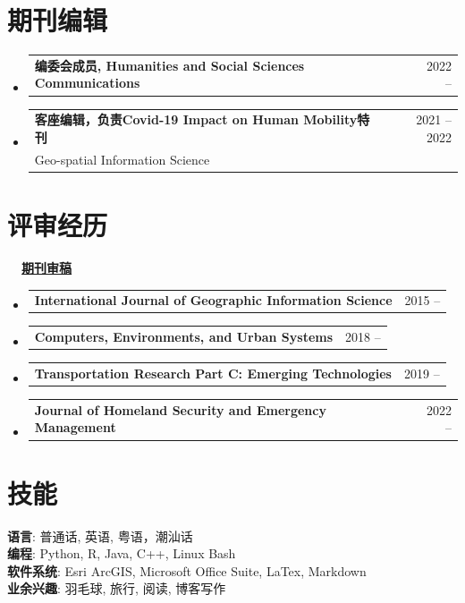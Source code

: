\documentclass[A4,11pt]{article}
\makeatletter
\newcommand{\CVSubheading}[4]{
  \vspace{-2pt}\item
    \begin{tabular*}{0.97\textwidth}[t]{l@{\extracolsep{\fill}}r}
      \textbf{#1} & #2 \\
      \small#3 & \small #4 \\
    \end{tabular*}\vspace{-7pt}
}
\newcommand{\CVSubheadingSimple}[2]{
  \vspace{-2pt}\item
    \begin{tabular*}{0.97\textwidth}[t]{l@{\extracolsep{\fill}}r}
      \textbf{#1} & #2 \\
    \end{tabular*}\vspace{-7pt}
}
\newcommand{\CVSubHeadingListStart}{\begin{itemize}[leftmargin=0.5cm, label={}]}
\newcommand{\CVSubHeadingListEnd}{\end{itemize}}
\makeatother
\begin{document}
\begin{CJK*}{UTF8}{gbsn}
\section{期刊编辑}
  \CVSubHeadingListStart
    \CVSubheadingSimple
      {编委会成员, Humanities and Social Sciences Communications}{2022 --}
      
    \CVSubheading
      {客座编辑，负责Covid-19 Impact on Human Mobility特刊}{2021 -- 2022}
      {Geo-spatial Information Science}{}
      
  \CVSubHeadingListEnd

\section{评审经历}
\noindent \textbf{\ \ \underline{期刊审稿}}
  \CVSubHeadingListStart

    \CVSubheadingSimple
      {International Journal of Geographic Information Science}{2015 --}
    \CVSubheadingSimple
      {Computers, Environments, and Urban Systems}{2018 --}
    \CVSubheadingSimple
      {Transportation Research Part C: Emerging Technologies}{2019 --}
    \CVSubheadingSimple
      {Journal of Homeland Security and Emergency Management}{2022 --}
  \CVSubHeadingListEnd

\section{技能}
 \begin{itemize}[leftmargin=0.5cm, label={}]
    \small{\item{
     \textbf{语言}{: 普通话, 英语, 粤语，潮汕话} \\
     \textbf{编程}{: Python, R, Java, C++, Linux Bash} \\
     \textbf{软件系统}{: Esri ArcGIS, Microsoft Office Suite, LaTex, Markdown} \\
     \textbf{业余兴趣}{: 羽毛球, 旅行, 阅读, 博客写作} \\
    }}
 \end{itemize}
    
\end{CJK*}
\end{document}
